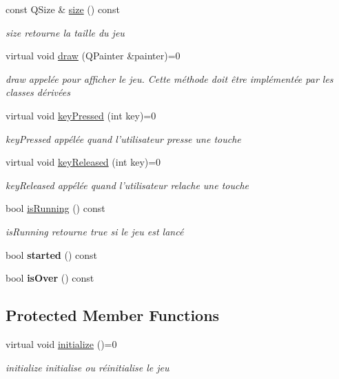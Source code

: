 \begin{DoxyCompactItemize}
\item 
const Q\-Size \& \hyperlink{classGame_aef028fef77b6498c42f347400b1ebf55}{size} () const 
\begin{DoxyCompactList}\small\item\em size retourne la taille du jeu \end{DoxyCompactList}\item 
virtual void \hyperlink{classGame_abac442d78efd636de9ab80f28eab92ef}{draw} (Q\-Painter \&painter)=0
\begin{DoxyCompactList}\small\item\em draw appelée pour afficher le jeu. Cette méthode doit être implémentée par les classes dérivées \end{DoxyCompactList}\item 
virtual void \hyperlink{classGame_a90bb392d6ca1dd209388bf43a25ac0b2}{key\-Pressed} (int key)=0
\begin{DoxyCompactList}\small\item\em key\-Pressed appélée quand l'utilisateur presse une touche \end{DoxyCompactList}\item 
virtual void \hyperlink{classGame_adad85a1736ff369687f77695fecb8ffe}{key\-Released} (int key)=0
\begin{DoxyCompactList}\small\item\em key\-Released appélée quand l'utilisateur relache une touche \end{DoxyCompactList}\item 
bool \hyperlink{classGame_abb31098c8d016b98888fe9acac497fcb}{is\-Running} () const 
\begin{DoxyCompactList}\small\item\em is\-Running retourne true si le jeu est lancé \end{DoxyCompactList}\item 
\hypertarget{classGame_a63813e2be95eae3b03483c2918558fc7}{bool {\bfseries started} () const }\label{classGame_a63813e2be95eae3b03483c2918558fc7}

\item 
\hypertarget{classGame_a7fc0fd3e81b2425bb66d52453eda86e1}{bool {\bfseries is\-Over} () const }\label{classGame_a7fc0fd3e81b2425bb66d52453eda86e1}

\end{DoxyCompactItemize}
\subsection*{Protected Member Functions}
\begin{DoxyCompactItemize}
\item 
\hypertarget{classGame_a948ffd91069e102438caeb687e1be9be}{virtual void \hyperlink{classGame_a948ffd91069e102438caeb687e1be9be}{initialize} ()=0}\label{classGame_a948ffd91069e102438caeb687e1be9be}

\begin{DoxyCompactList}\small\item\em initialize initialise ou réinitialise le jeu \end{DoxyCompactList}\end{DoxyCompactItemize}

